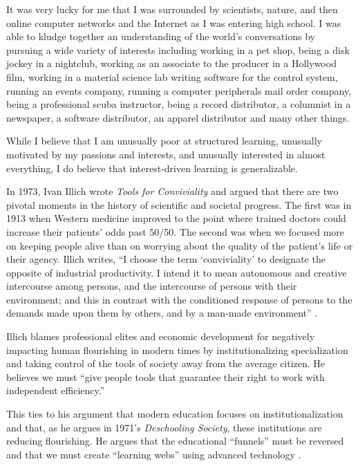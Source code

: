 It was very lucky for me that I was surrounded by scientists, nature, and then online computer networks and the Internet as I was entering high school. I was able to kludge together an understanding of the world's conversations by pursuing a wide variety of interests including working in a pet shop, being a disk jockey in a nightclub, working as an associate to the producer in a Hollywood film, working in a material science lab writing software for the control system, running an events company, running a computer peripherals mail order company, being a professional scuba instructor, being a record distributor, a columnist in a newspaper, a software distributor, an apparel distributor and many other things.

While I believe that I am unusually poor at structured learning, unusually motivated by my passions and interests, and unusually interested in almost everything, I do believe that interest-driven learning is generalizable.

In 1973, Ivan Illich wrote \emph{Tools for Conviviality} and argued that there are two pivotal moments in the history of scientific and societal progress. The first was in 1913 when Western medicine improved to the point where trained doctors could increase their patients' odds past 50/50. The second was when we focused more on keeping people alive than on worrying about the quality of the patient's life or their agency. Illich writes, ``I choose the term `conviviality' to designate the opposite of industrial productivity. I intend it to mean autonomous and creative intercourse among persons, and the intercourse of persons with their environment; and this in contrast with the conditioned response of persons to the demands made upon them by others, and by a man-made environment'' \cite{Illich:1973aa}.

Illich blames professional elites and economic development for negatively impacting human flourishing in modern times by institutionalizing specialization and taking control of the tools of society away from the average citizen. He believes we must ``give people tools that guarantee their right to work with independent efficiency.''

This ties to his argument that modern education focuses on institutionalization and that, as he argues in 1971's \emph{Deschooling Society}, these institutions are reducing flourishing. He argues that the educational ``funnels'' must be reversed and that we must create ``learning webs'' using advanced technology \cite{Illich:1971aa}.

